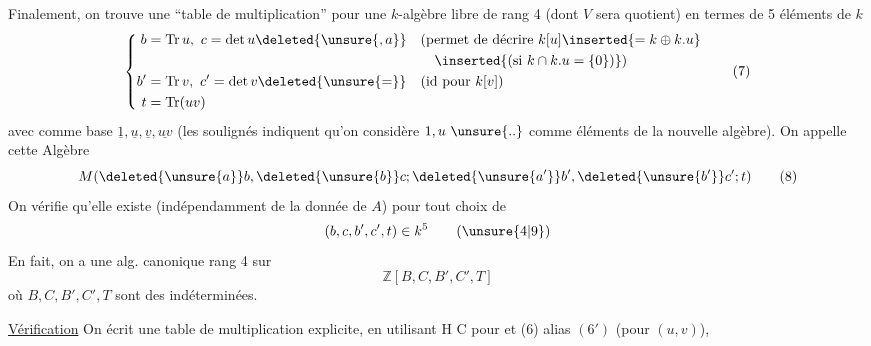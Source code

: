 Finalement, on trouve une ``table de multiplication'' pour une $k$-algèbre libre de rang 4 (dont $V$ sera quotient)  en termes de 5 éléments de $k$
\[
\left\{\begin{aligned}
 b&=\operatorname{Tr}u,\ c=\det u\deleted{\unsure{,a}}&
 &\text{(permet de décrire } k[u]\inserted{=k\oplus k.u}\\
 &&&\quad \inserted{\text{(si }k\cap k.u=\{0\}\text{)}}\text{)}\\
 b'&=\operatorname{Tr}v,\ c'=\det v\deleted{\unsure{=}}&&\text{(id pour } k[v]\text{)}\\
 t&=\operatorname{Tr}(uv)
\end{aligned}\right. \tag*{(7)}
\]
avec comme base $\underline{1},\underline{u},\underline{v},\underline{uv}$ (les soulignés indiquent qu'on considère $1,u\ \unsure{..}$ comme éléments de la nouvelle algèbre). On appelle cette Algèbre
\[ M(\deleted{\unsure{a}}b,\deleted{\unsure{b}}c;\deleted{\unsure{a'}}b',\deleted{\unsure{b'}}c';t) \tag*{(8)} \]
On vérifie qu'elle existe (indépendamment de la donnée de $A$) pour tout choix de 
\[ (b,c,b',c',t)\in k^5 \tag*{(\unsure{4|9})} \]
En fait, on a une alg. canonique  rang 4 sur
\[ \mathbb Z[B,C,B',C',T] \]
où $B,C,B',C',T$ sont des indéterminées.

\uline{Vérification} On écrit une table de multiplication explicite, en utilisant H C pour  et (6) alias $(6')$ (pour $(u,v)$),
